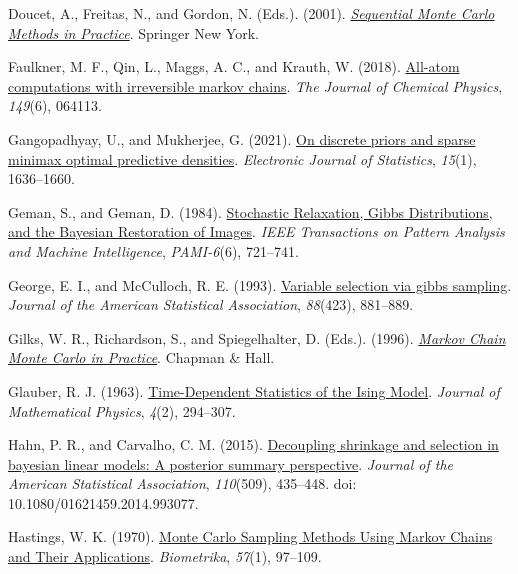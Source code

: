 \documentclass[
]{article}
\newlength{\cslhangindent}
\newenvironment{CSLReferences}[2] %
 {\begin{list}{}{%
  \setlength{\itemindent}{0pt}
  \setlength{\leftmargin}{0pt}
  \setlength{\parsep}{0pt}
  \ifodd #1
   \setlength{\leftmargin}{\cslhangindent}
   \setlength{\itemindent}{-1\cslhangindent}
  \fi
  \setlength{\itemsep}{#2\baselineskip}}}
 {\end{list}}
\theoremstyle{StatementsWithUnderline}\newtheorem{theorem}{定理}[section]\newtheorem{definition}[theorem]{定義}\newtheorem{corollary}[theorem]{系}\newtheorem{proposition}[theorem]{命題}\newtheorem{lemma}[theorem]{補題}\newtheorem{example}[theorem]{例}
\theoremstyle{definition}\newtheorem{notation}[theorem]{記法}\newtheorem{algorithm}[theorem]{算譜}\newtheorem{remarks}[theorem]{要諦}\newtheorem{remark}[theorem]{注}
\begin{document}
\begin{CSLReferences}{1}{1}
Doucet, A., Freitas, N., and Gordon, N. (Eds.). (2001).
\emph{\href{https://doi.org/10.1007/978-1-4757-3437-9}{{Sequential Monte
Carlo Methods in Practice}}}. Springer New York.

Faulkner, M. F., Qin, L., Maggs, A. C., and Krauth, W. (2018).
\href{https://doi.org/10.1063/1.5036638}{All-atom computations with
irreversible markov chains}. \emph{The Journal of Chemical Physics},
\emph{149}(6), 064113.

Gangopadhyay, U., and Mukherjee, G. (2021).
\href{https://doi.org/10.1214/21-EJS1818}{{On discrete priors and sparse
minimax optimal predictive densities}}. \emph{Electronic Journal of
Statistics}, \emph{15}(1), 1636--1660.

Geman, S., and Geman, D. (1984).
\href{https://doi.org/10.1109/TPAMI.1984.4767596}{{Stochastic
Relaxation, Gibbs Distributions, and the Bayesian Restoration of
Images}}. \emph{IEEE Transactions on Pattern Analysis and Machine
Intelligence}, \emph{PAMI-6}(6), 721--741.

George, E. I., and McCulloch, R. E. (1993).
\href{http://www.jstor.org/stable/2290777}{Variable selection via gibbs
sampling}. \emph{Journal of the American Statistical Association},
\emph{88}(423), 881--889.

Gilks, W. R., Richardson, S., and Spiegelhalter, D. (Eds.). (1996).
\emph{\href{https://doi.org/10.1201/b14835}{{Markov Chain Monte Carlo in
Practice}}}. Chapman \& Hall.

Glauber, R. J. (1963).
\href{https://doi.org/10.1063/1.1703954}{{Time-Dependent Statistics of
the Ising Model}}. \emph{Journal of Mathematical Physics}, \emph{4}(2),
294--307.

Hahn, P. R., and Carvalho, C. M. (2015).
\href{https://doi.org/10.1080/01621459.2014.993077}{Decoupling shrinkage
and selection in bayesian linear models: A posterior summary
perspective}. \emph{Journal of the American Statistical Association},
\emph{110}(509), 435--448. doi: 10.1080/01621459.2014.993077.

Hastings, W. K. (1970).
\href{https://www.jstor.org/stable/2334940}{{Monte Carlo Sampling
Methods Using Markov Chains and Their Applications}}. \emph{Biometrika},
\emph{57}(1), 97--109.


\end{CSLReferences}
\end{document}
